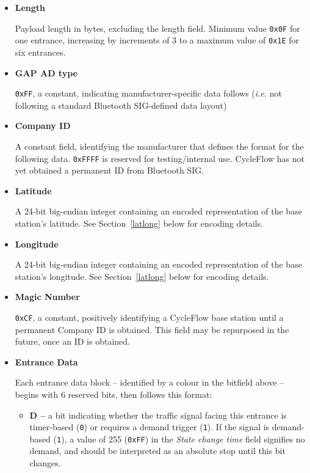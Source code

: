 \documentclass[12pt, oneside]{article}
\begin{document}
\begin{itemize}
\item \textbf{Length}

Payload length in bytes, excluding the length field. Minimum value \texttt{0x0F} for one entrance, increasing by increments of 3 to a maximum value of \texttt{0x1E} for six entrances.


\item \textbf{GAP AD type}

\texttt{0xFF}, a constant, indicating manufacturer-specific data follows (\textit{i.e.} not following a standard Bluetooth SIG-defined data layout)

\item \textbf{Company ID}

A constant field, identifying the manufacturer that defines the format for the following data. \texttt{0xFFFF} is reserved for testing/internal use. CycleFlow has not yet obtained a permanent ID from Bluetooth SIG.

\item \textbf{Latitude}

A 24-bit big-endian integer containing an encoded representation of the base station's latitude. See Section~\ref{latlong} below for encoding details.

\item \textbf{Longitude}

A 24-bit big-endian integer containing an encoded representation of the base station's longitude. See Section~\ref{latlong} below for encoding details.

\item \textbf{Magic Number}

\texttt{0xCF}, a constant, positively identifying a CycleFlow base station until a permanent Company ID is obtained. This field may be repurposed in the future, once an ID is obtained.

\item \textbf{Entrance Data}

Each entrance data block -- identified by a colour in the bitfield above -- begins with 6 reserved bits, then follows this format:

\begin{itemize}
\item \textbf{D --} a bit indicating whether the traffic signal facing this entrance is timer-based (\texttt{0}) or requires a demand trigger (\texttt{1}). If the signal is demand-based (\texttt{1}), a value of 255 (\texttt{0xFF}) in the \textit{State change time} field signifies no demand, and should be interpreted as an absolute stop until this bit changes.


\end{itemize}
\end{itemize}
\end{document}
